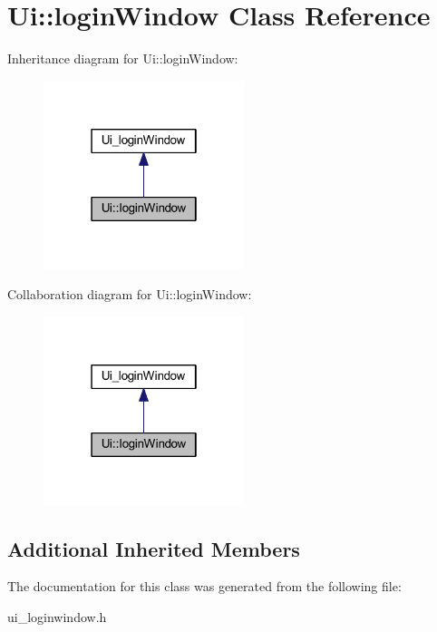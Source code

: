 \hypertarget{class_ui_1_1login_window}{}\section{Ui\+:\+:login\+Window Class Reference}
\label{class_ui_1_1login_window}


Inheritance diagram for Ui\+:\+:login\+Window\+:
\nopagebreak
\begin{figure}[H]
\begin{center}
\leavevmode
\includegraphics[width=166pt]{class_ui_1_1login_window__inherit__graph}
\end{center}
\end{figure}


Collaboration diagram for Ui\+:\+:login\+Window\+:
\nopagebreak
\begin{figure}[H]
\begin{center}
\leavevmode
\includegraphics[width=166pt]{class_ui_1_1login_window__coll__graph}
\end{center}
\end{figure}
\subsection*{Additional Inherited Members}


The documentation for this class was generated from the following file\+:\begin{DoxyCompactItemize}
\item 
ui\+\_\+loginwindow.\+h\end{DoxyCompactItemize}
